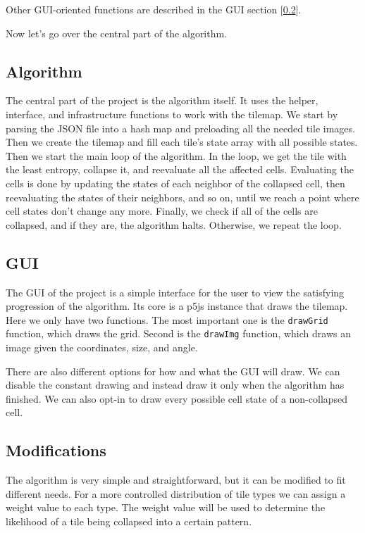 \documentclass[10pt,oneside,a4paper]{article}
\begin{document}
Other GUI-oriented functions are described in the GUI section [\ref*{sec:gui}].

Now let's go over the central part of the algorithm.


\subsection{Algorithm}\label{sec:algorithm}
The central part of the project is the algorithm itself.
It uses the helper, interface, and infrastructure functions to work with the tilemap.
We start by parsing the JSON file into a hash map and preloading all the needed tile images.
Then we create the tilemap and fill each tile's state array with all possible states.
Then we start the main loop of the algorithm.
In the loop, we get the tile with the least entropy, collapse it, and reevaluate all the affected cells.
Evaluating the cells is done by updating the states of each neighbor of the collapsed cell, then reevaluating the states of their neighbors, and so on, until we reach a point where cell states don't change any more.
Finally, we check if all of the cells are collapsed, and if they are, the algorithm halts.
Otherwise, we repeat the loop.

\subsection{GUI}\label{sec:gui}
The GUI of the project is a simple interface for the user to view the satisfying progression of the algorithm.
Its core is a p5js instance that draws the tilemap.
Here we only have two functions. 
The most important one is the \texttt{drawGrid} function, which draws the grid.
Second is the \texttt{drawImg} function, which draws an image given the coordinates, size, and angle.

There are also different options for how and what the GUI will draw.
We can disable the constant drawing and instead draw it only when the algorithm has finished.
We can also opt-in to draw every possible cell state of a non-collapsed cell.

\subsection{Modifications}\label{sec:modifications}
The algorithm is very simple and straightforward, but it can be modified to fit different needs.
For a more controlled distribution of tile types we can assign a weight value to each type.
The weight value will be used to determine the likelihood of a tile being collapsed into a certain pattern.
\end{document}

